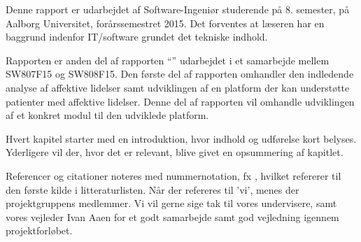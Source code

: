 Denne rapport er udarbejdet af Software-Ingeniør studerende på 8. semester, på Aalborg Universitet, forårssemestret 2015.
Det forventes at læseren har en baggrund indenfor IT/software grundet det tekniske indhold.

Rapporten er anden del af rapporten ``'' udarbejdet i et samarbejde mellem SW807F15 og SW808F15.
Den første del af rapporten omhandler den indledende analyse af affektive lidelser samt udviklingen af en platform der kan understøtte patienter med affektive lidelser.
Denne del af rapporten vil omhandle udviklingen af et konkret modul til den udviklede platform.

Hvert kapitel starter med en introduktion, hvor indhold og udførelse kort belyses.
Yderligere vil der, hvor det er relevant, blive givet en opsummering af kapitlet.

Referencer og citationer noteres med nummernotation, fx \cite{faelles}, hvilket refererer til den første kilde i litteraturlisten.
Når der refereres til 'vi', menes der projektgruppens medlemmer.
\newline
\newline
Vi vil gerne sige tak til vores undervisere, samt vores vejleder Ivan Aaen for et godt samarbejde samt god vejledning igennem projektforløbet.